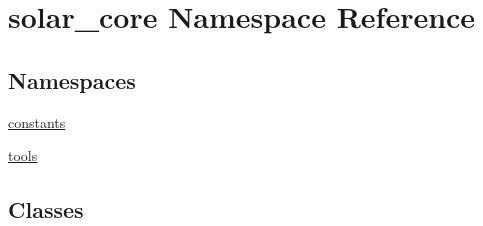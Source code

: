 \hypertarget{namespacesolar__core}{}\section{solar\+\_\+core Namespace Reference}
\label{namespacesolar__core}
\subsection*{Namespaces}
\begin{DoxyCompactItemize}
\item 
 \hyperlink{namespacesolar__core_1_1constants}{constants}
\item 
 \hyperlink{namespacesolar__core_1_1tools}{tools}
\end{DoxyCompactItemize}
\subsection*{Classes}
